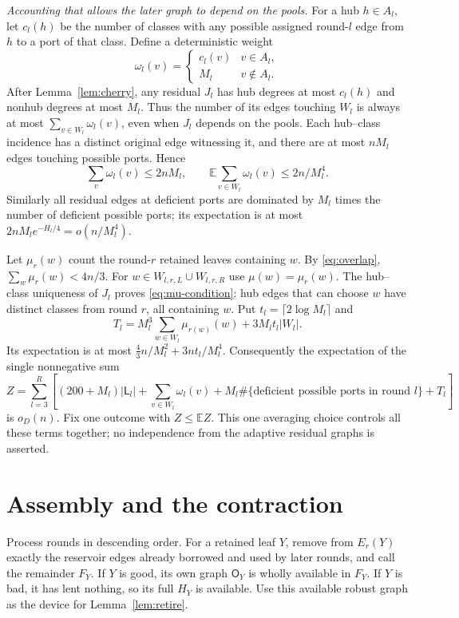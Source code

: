 \documentclass[11pt]{article}
\theoremstyle{remark}\newtheorem*{remark}{Remark}
\newcommand{\E}{\mathbb E}
\newcommand{\Own}{\mathsf O}
\newcommand{\Lost}{\mathsf L}
\begin{document}
\emph{Accounting that allows the later graph to depend on the pools.}
For a hub $h\in A_l$, let $c_l(h)$ be the number of classes with any
possible assigned round-$l$ edge from $h$ to a port of that class.
Define a deterministic weight
\[
 \omega_l(v)=\begin{cases}c_l(v)&v\in A_l,\\M_l&v\notin A_l.
 \end{cases}
\]
After Lemma~\ref{lem:cherry}, any residual $J_l$ has hub degrees at
most $c_l(h)$ and nonhub degrees at most $M_l$. Thus the number of
its edges touching $W_l$ is always at most
$\sum_{v\in W_l}\omega_l(v)$, even when $J_l$ depends on the pools.
Each hub--class incidence has a distinct original edge witnessing it,
and there are at most $nM_l$ edges touching possible ports. Hence
\begin{equation}\label{eq:pool-payment}
 \sum_v\omega_l(v)\le2nM_l,\qquad
 \E\sum_{v\in W_l}\omega_l(v)\le2n/M_l^4.
\end{equation}
Similarly all residual edges at deficient ports are dominated by $M_l$
times the number of deficient possible ports; its expectation is at
most $2nM_le^{-H_l/4}=o(n/M_l^4)$.

Let $\mu_r(w)$ count the round-$r$ retained leaves containing $w$.
By \eqref{eq:overlap}, $\sum_w\mu_r(w)<4n/3$.
For $w\in W_{l,r,L}\cup W_{l,r,R}$ use $\mu(w)=\mu_r(w)$.
The hub--class uniqueness of $J_l$ proves \eqref{eq:mu-condition}:
hub edges that can choose $w$ have distinct classes from round $r$,
all containing $w$.
Put $t_l=\lceil2\log M_l\rceil$ and
\[
 T_l=M_l^3\sum_{w\in W_l}\mu_{r(w)}(w)+3M_lt_l|W_l|.
\]
Its expectation is at most
$\tfrac43n/M_l^2+3nt_l/M_l^4$.
Consequently the expectation of the single nonnegative sum
\begin{equation}\label{eq:objective}
 Z=\sum_{l=3}^R\left[(200+M_l)|\Lost_l|
       +\sum_{v\in W_l}\omega_l(v)
       +M_l\#\{\text{deficient possible ports in round }l\}+T_l\right]
\end{equation}
is $o_D(n)$. Fix one outcome with $Z\le\E Z$.
This one averaging choice controls all these terms together; no
independence from the adaptive residual graphs is asserted.

\section{Assembly and the contraction}
Process rounds in descending order. For a retained leaf $Y$, remove
from $E_r(Y)$ exactly the reservoir edges already borrowed and used by later rounds,
and call the remainder $F_Y$. If $Y$ is good, its own graph
$\Own_Y$ is wholly available in $F_Y$. If $Y$ is bad, it has lent
nothing, so its full $H_Y$ is available. Use this available robust
graph as the device for Lemma~\ref{lem:retire}.
\end{document}
